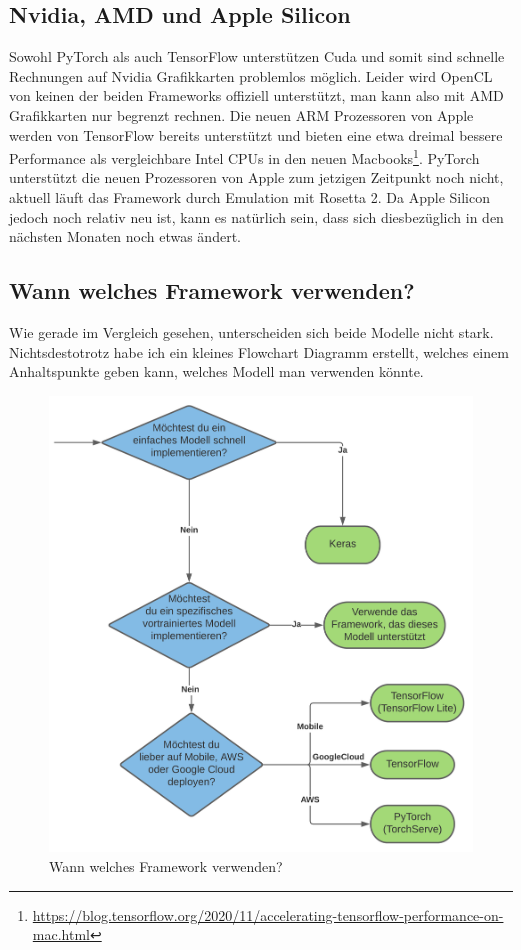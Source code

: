 \subsection{Nvidia, AMD und Apple Silicon}
Sowohl PyTorch als auch TensorFlow unterstützen Cuda und somit sind schnelle Rechnungen auf Nvidia Grafikkarten problemlos möglich. 
Leider wird OpenCL von keinen der beiden Frameworks offiziell unterstützt, man kann also mit AMD Grafikkarten nur begrenzt rechnen.
Die neuen ARM Prozessoren von Apple werden von TensorFlow bereits unterstützt und bieten eine etwa dreimal bessere Performance als 
vergleichbare Intel CPUs in den neuen Macbooks\footnote{\url{https://blog.tensorflow.org/2020/11/accelerating-tensorflow-performance-on-mac.html}}.
PyTorch unterstützt die neuen Prozessoren von Apple zum jetzigen Zeitpunkt noch nicht, aktuell läuft das Framework durch Emulation mit Rosetta 2.
Da Apple Silicon jedoch noch relativ neu ist, kann es natürlich sein, dass sich diesbezüglich in den nächsten Monaten noch etwas ändert.

\subsection{Wann welches Framework verwenden?}

Wie gerade im Vergleich gesehen, unterscheiden sich beide Modelle nicht stark. Nichtsdestotrotz habe ich ein kleines Flowchart Diagramm erstellt, 
welches einem Anhaltspunkte geben kann, welches Modell man verwenden könnte. 

\begin{figure}[htbp]
    \centering
    \includegraphics[width=.9\textwidth]{figures/decision-tree}
    \caption{Wann welches Framework verwenden?}
    \label{fig:decision-tree}
\end{figure}